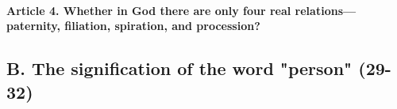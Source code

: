 \documentclass{ucetd}
\begin{document}
\paragraph{Article 4. Whether in God there are only four real relations—paternity, filiation, spiration, and procession?}
\subsection{B. The signification  of the word "person" (29-32)}
\end{document}
